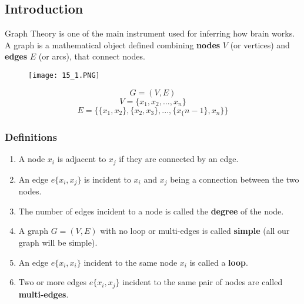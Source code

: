 \subsection{Introduction}
Graph Theory is one of the main instrument used for inferring how brain works.
A graph is a mathematical object defined combining \textbf{nodes} \(V\) (or vertices) and \textbf{edges} \(E\) (or arcs), that connect nodes.
\begin{figure}[H]
    \centering
    \texttt{[image: 15\_1.PNG]}
\end{figure}
\begin{equation*}
    G=(V,E)
\end{equation*}
\begin{equation*}
    V=\{x_1, x_2, ..., x_n\}
\end{equation*}
\begin{equation*}
    E=\{\{x_1, x_2\}, \{x_2,x_3\},..., \{x_\{n-1\},x_n\}\}
\end{equation*}
\subsubsection{Definitions}
\begin{enumerate}
    \item A node \(x_i\) is adjacent to \(x_j\) if they are connected by an edge.
    \item An edge \(e\{x_i, x_j\}\) is incident to \(x_i\) and \(x_j\) being a connection between the two nodes.
    \item The number of edges incident to a node is called the \textbf{degree} of the node.
    \item A graph \(G=(V,E)\) with no loop or multi-edges is called \textbf{simple} (all our graph will be simple).
    \item An edge \(e\{x_i,x_i\}\) incident to the same node \(x_i\) is called a \textbf{loop}.
    \item Two or more edges \(e\{x_i,x_j\}\) incident to the same pair of nodes are called \textbf{multi-edges}.
\end{enumerate}
